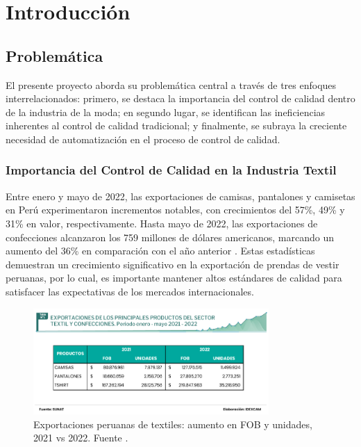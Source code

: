 \chapter{Introducción}
\section{Problemática}

El presente proyecto aborda su problemática central a través de tres enfoques interrelacionados: primero, se destaca la importancia del control de calidad dentro de la industria de la moda; en segundo lugar, se identifican las ineficiencias inherentes al control de calidad tradicional; y finalmente, se subraya la creciente necesidad de automatización en el proceso de control de calidad.

\subsection*{Importancia del Control de Calidad en la Industria Textil}

Entre enero y mayo de 2022, las exportaciones de camisas, pantalones y camisetas en Perú experimentaron incrementos notables, con crecimientos del 57\%, 49\% y 31\% en valor, respectivamente. Hasta mayo de 2022, las exportaciones de confecciones alcanzaron los 759 millones de dólares americanos, marcando un aumento del 36\% en comparación con el año anterior \cite{LaCamara2022}. Estas estadísticas demuestran un crecimiento significativo en la exportación de prendas de vestir peruanas, por lo cual, es importante mantener altos estándares de calidad para satisfacer las expectativas de los mercados internacionales.

\begin{figure}[H]
	\centering
	\includegraphics[width=0.8\textwidth]{img/exportaciones.jpg}
	\caption[Exportaciones peruanas de textiles: aumento en FOB y unidades, 2021 vs 2022.]{Exportaciones peruanas de textiles: aumento en FOB y unidades, 2021 vs 2022. Fuente \cite{LaCamara2022}.}
\end{figure}

